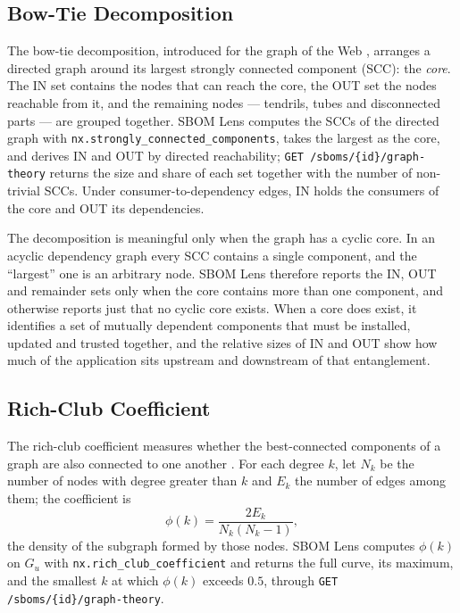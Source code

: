 \subsection{Bow-Tie Decomposition}
\label{sec:ns-bowtie}

The bow-tie decomposition, introduced for the graph of the Web \citep{Broder2000}, arranges a directed graph around its largest strongly connected component (SCC): the \textit{core}. The IN set contains the nodes that can reach the core, the OUT set the nodes reachable from it, and the remaining nodes --- tendrils, tubes and disconnected parts --- are grouped together. SBOM Lens computes the SCCs of the directed graph with \texttt{nx.strongly\_connected\_components}, takes the largest as the core, and derives IN and OUT by directed reachability; \texttt{GET /sboms/\{id\}/graph-theory} returns the size and share of each set together with the number of non-trivial SCCs. Under consumer-to-dependency edges, IN holds the consumers of the core and OUT its dependencies.

The decomposition is meaningful only when the graph has a cyclic core. In an acyclic dependency graph every SCC contains a single component, and the ``largest'' one is an arbitrary node. SBOM Lens therefore reports the IN, OUT and remainder sets only when the core contains more than one component, and otherwise reports just that no cyclic core exists. When a core does exist, it identifies a set of mutually dependent components that must be installed, updated and trusted together, and the relative sizes of IN and OUT show how much of the application sits upstream and downstream of that entanglement.


\subsection{Rich-Club Coefficient}
\label{sec:ns-richclub}

The rich-club coefficient measures whether the best-connected components of a graph are also connected to one another \citep{Colizza2006}. For each degree \(k\), let \(N_k\) be the number of nodes with degree greater than \(k\) and \(E_k\) the number of edges among them; the coefficient is
\[
    \phi(k) = \frac{2 E_k}{N_k (N_k - 1)},
\]
the density of the subgraph formed by those nodes. SBOM Lens computes \(\phi(k)\) on \(G_u\) with \texttt{nx.rich\_club\_coefficient} and returns the full curve, its maximum, and the smallest \(k\) at which \(\phi(k)\) exceeds \(0.5\), through \texttt{GET /sboms/\{id\}/graph-theory}.

